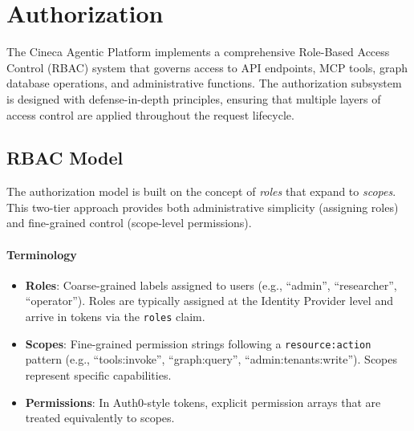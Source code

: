 
\section{Authorization}
\label{sec:authorization}

The Cineca Agentic Platform implements a comprehensive Role-Based Access Control (RBAC) system that governs access to API endpoints, MCP tools, graph database operations, and administrative functions. The authorization subsystem is designed with defense-in-depth principles, ensuring that multiple layers of access control are applied throughout the request lifecycle.

\subsection{RBAC Model}
\label{subsec:rbac-model}

The authorization model is built on the concept of \textit{roles} that expand to \textit{scopes}. This two-tier approach provides both administrative simplicity (assigning roles) and fine-grained control (scope-level permissions).

\paragraph{Terminology}
\begin{itemize}
    \item \textbf{Roles}: Coarse-grained labels assigned to users (e.g., ``admin'', ``researcher'', ``operator''). Roles are typically assigned at the Identity Provider level and arrive in tokens via the \texttt{roles} claim.
    \item \textbf{Scopes}: Fine-grained permission strings following a \texttt{resource:action} pattern (e.g., ``tools:invoke'', ``graph:query'', ``admin:tenants:write''). Scopes represent specific capabilities.
    \item \textbf{Permissions}: In Auth0-style tokens, explicit permission arrays that are treated equivalently to scopes.
\end{itemize}

